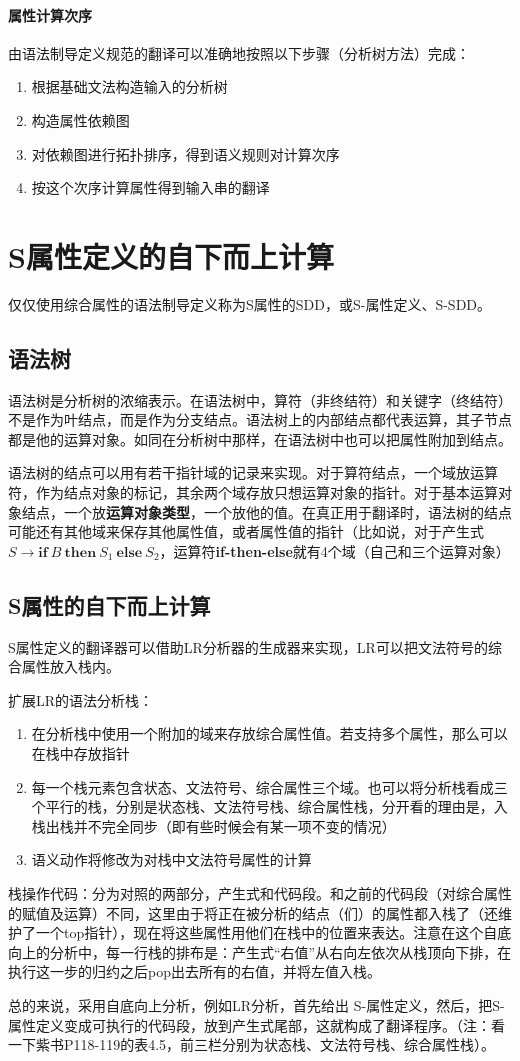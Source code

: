 \documentclass[]{report}
\begin{document}
		\paragraph{属性计算次序}
		由语法制导定义规范的翻译可以准确地按照以下步骤（分析树方法）完成：
		\begin{enumerate}
			\item 根据基础文法构造输入的分析树
			\item 构造属性依赖图
			\item 对依赖图进行拓扑排序，得到语义规则对计算次序
			\item 按这个次序计算属性得到输入串的翻译
		\end{enumerate}
	\section{S属性定义的自下而上计算}
	仅仅使用综合属性的语法制导定义称为S属性的SDD，或S-属性定义、S-SDD。
		\subsection{语法树}
		语法树是分析树的浓缩表示。在语法树中，算符（非终结符）和关键字（终结符）不是作为叶结点，而是作为分支结点。语法树上的内部结点都代表运算，其子节点都是他的运算对象。如同在分析树中那样，在语法树中也可以把属性附加到结点。\par
		语法树的结点可以用有若干指针域的记录来实现。对于算符结点，一个域放运算符，作为结点对象的标记，其余两个域存放只想运算对象的指针。对于基本运算对象结点，一个放\textbf{运算对象类型}，一个放他的值。在真正用于翻译时，语法树的结点可能还有其他域来保存其他属性值，或者属性值的指针（比如说，对于产生式$S\to\mathbf{if}\ B\ \mathbf{then}\ S_1\ \mathbf{else}\ S_2$，运算符\textbf{if-then-else}就有4个域（自己和三个运算对象）
		\subsection{S属性的自下而上计算}
		S属性定义的翻译器可以借助LR分析器的生成器来实现，LR可以把文法符号的综合属性放入栈内。\par
		扩展LR的语法分析栈：
		\begin{enumerate}
			\item 在分析栈中使用一个附加的域来存放综合属性值。若支持多个属性，那么可以在栈中存放指针
			\item 每一个栈元素包含状态、文法符号、综合属性三个域。也可以将分析栈看成三个平行的栈，分别是状态栈、文法符号栈、综合属性栈，分开看的理由是，入栈出栈并不完全同步（即有些时候会有某一项不变的情况）
			\item 语义动作将修改为对栈中文法符号属性的计算
		\end{enumerate}\par
		栈操作代码：分为对照的两部分，产生式和代码段。和之前的代码段（对综合属性的赋值及运算）不同，这里由于将正在被分析的结点（们）的属性都入栈了（还维护了一个top指针），现在将这些属性用他们在栈中的位置来表达。注意在这个自底向上的分析中，每一行栈的排布是：产生式“右值”从右向左依次从栈顶向下排，在执行这一步的归约之后pop出去所有的右值，并将左值入栈。\par
		总的来说，采用自底向上分析，例如LR分析，首先给出 S-属性定义，然后，把S-属性定义变成可执行的代码段，放到产生式尾部，这就构成了翻译程序。（注：看一下紫书P118-119的表4.5，前三栏分别为状态栈、文法符号栈、综合属性栈）。
\end{document}
